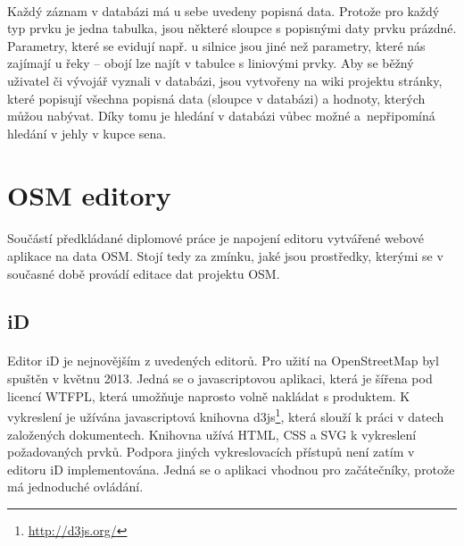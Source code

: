 \documentclass[11pt,a4paper,titlepage,oneside]{book}
\begin{document}

	\paragraph{}Každý záznam v databázi má u sebe uvedeny popisná data. Protože pro každý typ prvku je jedna tabulka, jsou některé sloupce s popisnými daty prvku prázdné. Parametry, které se evidují např. u silnice jsou jiné než parametry, které nás zajímají u řeky -- obojí lze najít v tabulce s liniovými prvky. Aby se běžný uživatel či vývojář vyznali v databázi, jsou vytvořeny na wiki projektu stránky, které popisují všechna popisná data (sloupce v databázi) a hodnoty, kterých můžou nabývat. Díky tomu je hledání v databázi vůbec možné a~nepřipomíná hledání v jehly v kupce sena.


	\section{OSM editory} %
		\label{sec:editory}
		\paragraph{} Součástí předkládané diplomové práce je napojení editoru vytvářené web\-ové aplikace na data \ac{OSM}. Stojí tedy za zmínku, jaké jsou prostředky, kterými se v současné době provádí editace dat projektu \ac{OSM}. 
		\subsection{iD}



			\paragraph{}Editor iD je nejnovějším z uvedených editorů. Pro užití na OpenStreetMap byl spuštěn v květnu 2013. Jedná se o javascriptovou aplikaci, která je šířena pod licencí \ac{WTFPL}\cite{wiki_wtfpl}, která umožňuje naprosto volně nakládat s produktem. K vykreslení je užívána javascriptová knihovna d3js\footnote{\url{http://d3js.org/}}, která slouží k práci v datech založených dokumentech. Knihovna užívá \ac{HTML}, \ac{CSS} a \ac{SVG} k vykreslení požadovaných prvků. Podpora jiných vykreslovacích přístupů není zatím v editoru iD implementována. Jedná se o aplikaci vhodnou pro začátečníky, protože má jednoduché ovládání.
\end{document}
